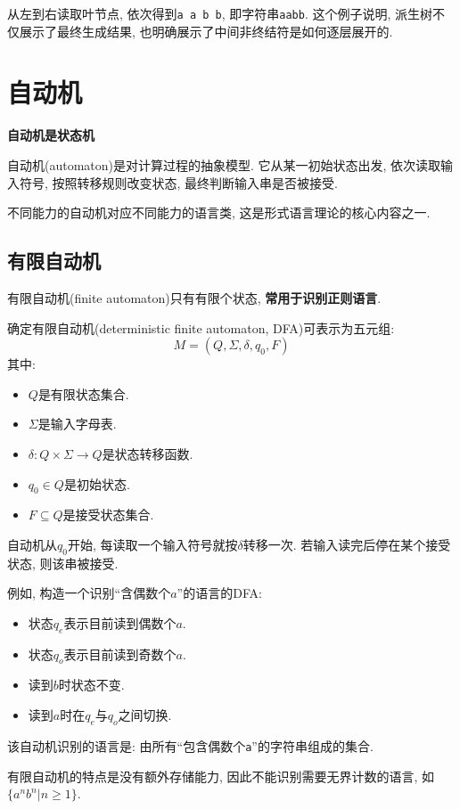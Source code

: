 从左到右读取叶节点, 依次得到\texttt{a a b b}, 即字符串\texttt{aabb}.
这个例子说明, 派生树不仅展示了最终生成结果, 也明确展示了中间非终结符是如何逐层展开的.

\section{自动机}


\textbf{自动机是状态机}

自动机(automaton)是对计算过程的抽象模型.
它从某一初始状态出发, 依次读取输入符号, 按照转移规则改变状态, 最终判断输入串是否被接受.

不同能力的自动机对应不同能力的语言类, 这是形式语言理论的核心内容之一.

\subsection{有限自动机}


有限自动机(finite automaton)只有有限个状态, \textbf{常用于识别正则语言}.

确定有限自动机(deterministic finite automaton, DFA)可表示为五元组:
\[
M = (Q, \Sigma, \delta, q_0, F)
\]
其中:

\begin{itemize}
\item $Q$是有限状态集合.
\item $\Sigma$是输入字母表.
\item $\delta: Q \times \Sigma \to Q$是状态转移函数.
\item $q_0 \in Q$是初始状态.
\item $F \subseteq Q$是接受状态集合.
\end{itemize}

自动机从$q_0$开始, 每读取一个输入符号就按$\delta$转移一次.
若输入读完后停在某个接受状态, 则该串被接受.

例如, 构造一个识别“含偶数个$a$”的语言的DFA:

\begin{itemize}
\item 状态$q_e$表示目前读到偶数个$a$.
\item 状态$q_o$表示目前读到奇数个$a$.
\item 读到$b$时状态不变.
\item 读到$a$时在$q_e$与$q_o$之间切换.
\end{itemize}

该自动机识别的语言是:
由所有“包含偶数个\texttt{a}”的字符串组成的集合.

有限自动机的特点是没有额外存储能力, 因此不能识别需要无界计数的语言, 如$\{a^n b^n | n \ge 1\}$.

